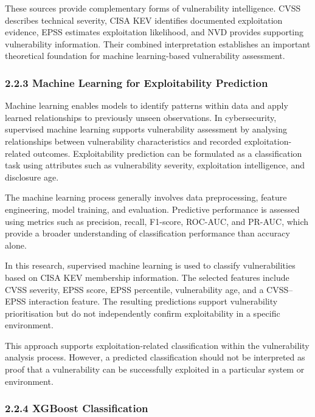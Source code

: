 \documentclass[
]{article}
\begin{document}
These sources provide complementary forms of vulnerability intelligence.
CVSS describes technical severity, CISA KEV identifies documented
exploitation evidence, EPSS estimates exploitation likelihood, and NVD
provides supporting vulnerability information. Their combined
interpretation establishes an important theoretical foundation for
machine learning-based vulnerability assessment.

\hypertarget{machine-learning-for-exploitability-prediction}{%
\subsubsection{2.2.3 Machine Learning for Exploitability
Prediction}\label{machine-learning-for-exploitability-prediction}}

Machine learning enables models to identify patterns within data and
apply learned relationships to previously unseen observations. In
cybersecurity, supervised machine learning supports vulnerability
assessment by analysing relationships between vulnerability
characteristics and recorded exploitation-related outcomes.
Exploitability prediction can be formulated as a classification task
using attributes such as vulnerability severity, exploitation
intelligence, and disclosure age.

The machine learning process generally involves data preprocessing,
feature engineering, model training, and evaluation. Predictive
performance is assessed using metrics such as precision, recall,
F1-score, ROC-AUC, and PR-AUC, which provide a broader understanding of
classification performance than accuracy alone.

In this research, supervised machine learning is used to classify
vulnerabilities based on CISA KEV membership information. The selected
features include CVSS severity, EPSS score, EPSS percentile,
vulnerability age, and a CVSS--EPSS interaction feature. The resulting
predictions support vulnerability prioritisation but do not
independently confirm exploitability in a specific environment.

This approach supports exploitation-related classification within the
vulnerability analysis process. However, a predicted classification
should not be interpreted as proof that a vulnerability can be
successfully exploited in a particular system or environment.

\hypertarget{xgboost-classification}{%
\subsubsection{2.2.4 XGBoost
Classification}\label{xgboost-classification}}
\end{document}
